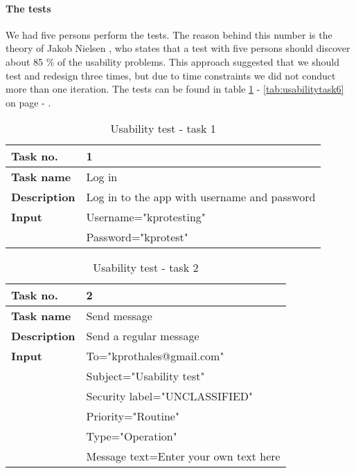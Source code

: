 		\paragraph{The tests}\hfill
\newline
			We had five persons perform the tests. The reason behind this number is the theory of Jakob Nielsen \cite{bib:useit}, who states that a test with five persons should discover about 85 \% of the usability problems. This approach suggested that we should test and redesign three times, but due to time constraints we did not conduct more than one iteration.  
\newline
\newline
		The tests can be found in table \ref{tab:usabilitytask1} - \ref{tab:usabilitytask6} on page \pageref{tab:usabilitytask1} - \pageref{tab:usabilitytask6}.
		\begin{table}[h!]
\begin{center}
			\begin{tabular}{>{\bfseries}l|l} \hline
				Task no.&1\\ \hline
				Task name&Log in\\ \hline
				Description&Log in to the app with username and password\\ \hline
				Input&Username="kprotesting" \\
					&Password="kprotest"\\ \hline
			\end{tabular}
\end{center}
			\caption{Usability test - task 1} \label{tab:usabilitytask1}
		\end{table}
		\begin{table}
\begin{center}
			\begin{tabular}{>{\bfseries}l|l}\hline
				Task no.&2\\ \hline
				Task name&Send message\\ \hline
				Description&Send a regular message\\ \hline
				Input&To="kprothales@gmail.com" \\
					&Subject="Usability test"\\
					&Security label="UNCLASSIFIED"\\ 
					&Priority="Routine"\\
					&Type="Operation"\\
					&Message text=Enter your own text here\\ \hline
			\end{tabular}
\end{center}
			\caption{Usability test - task 2} \label{tab:usabilitytask2}
		\end{table}
